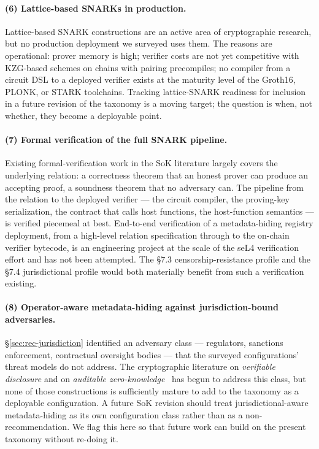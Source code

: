 \paragraph{(6) Lattice-based SNARKs in production.} Lattice-based
SNARK constructions are an active area of cryptographic research, but
no production deployment we surveyed uses them. The reasons are
operational: prover memory is high; verifier costs are not yet
competitive with KZG-based schemes on chains with pairing precompiles;
no compiler from a circuit DSL to a deployed verifier exists at the
maturity level of the Groth16, PLONK, or STARK toolchains. Tracking
lattice-SNARK readiness for inclusion in a future revision of the
taxonomy is a moving target; the question is when, not whether, they
become a deployable point.

\paragraph{(7) Formal verification of the full SNARK pipeline.}
Existing formal-verification work in the SoK literature largely
covers the underlying relation: a correctness theorem that an honest
prover can produce an accepting proof, a soundness theorem that no
adversary can. The pipeline from the relation to the deployed
verifier --- the circuit compiler, the proving-key serialization,
the contract that calls host functions, the host-function semantics
--- is verified piecemeal at best. End-to-end verification of a
metadata-hiding registry deployment, from a high-level relation
specification through to the on-chain verifier bytecode, is an
engineering project at the scale of the seL4 verification effort and
has not been attempted. The §7.3 censorship-resistance profile and
the §7.4 jurisdictional profile would both materially benefit from
such a verification existing.

\paragraph{(8) Operator-aware metadata-hiding against
jurisdiction-bound adversaries.} \S\ref{sec:rec-jurisdiction}
identified an adversary class --- regulators, sanctions enforcement,
contractual oversight bodies --- that the surveyed configurations'
threat models do not address. The cryptographic literature on
\emph{verifiable disclosure} and on \emph{auditable
zero-knowledge}~\cite{don-2019-fiat-shamir} has begun to address this
class, but none of those constructions is sufficiently mature to add
to the taxonomy as a deployable configuration. A future SoK revision
should treat jurisdictional-aware metadata-hiding as its own
configuration class rather than as a non-recommendation. We flag
this here so that future work can build on the present taxonomy
without re-doing it.

